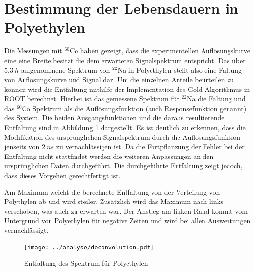 \documentclass[a4paper,12pt]{article}
\begin{document}
\section{Bestimmung der Lebensdauern in Polyethylen}\label{cap:poly}
Die Messungen mit $^{60}$Co haben gezeigt, dass die experimentellen Auflösungskurve eine eine Breite besitzt die dem erwarteten Signalspektrum entspricht.
Das über $\SI{5.3}{h}$ aufgenommene Spektrum von $^{22}$Na in Polyethylen
stellt also eine Faltung von Auflösungskurve und Signal dar. Um die einzelnen Anteile beurteilen zu
können wird die Entfaltung mithilfe der Implementation des Gold Algorithmus\cite{gold_algo} in
ROOT\cite{root} berechnet.
Hierbei ist das gemessene Spektrum für $^{22}$Na die Faltung und das $^{60}$Co Spektrum als die
Auflösungsfunktion (auch Responsefunktion genannt) des System.
Die beiden Ausgangsfunktionen und die daraus resultierende Entfaltung sind in Abbildung \ref{fig:deconvolution} dargestellt. Es ist deutlich zu erkennen, dass die
Modifikation des ursprünglichen Signalspektrum durch die Auflösungsfunktion jenseits von $\SI{2}{ns}$ zu vernachlässigen ist. Da die Fortpflanzung der Fehler bei
der Entfaltung nicht stattfindet werden die weiteren Anpassungen an den ursprünglichen Daten
durchgeführt. Die durchgeführte Entfaltung zeigt jedoch, dass dieses Vorgehen gerechtfertigt ist.

Am Maximum weicht die berechnete Entfaltung von der Verteilung von Polythylen ab und wird steiler.
Zusätzlich wird das Maximum nach links verschoben, was auch zu erwarten war.
Der Anstieg am linken Rand kommt vom Untergrund von Polyethylen für negative Zeiten und wird bei allen Auswertungen vernachlässigt.


\begin{figure}
	\texttt{[image: ../analyse/deconvolution.pdf]}
	\caption{Entfaltung des Spektrum für Polyethylen}
	\label{fig:deconvolution}
\end{figure}
\end{document}
